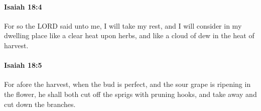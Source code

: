 		\paragraph{Isaiah 18:4} %
			\label{ISAIAH-18-4}

			For so the LORD said unto me, I will take my rest, and I will consider in my dwelling place like a clear heat upon herbs, and like a cloud of dew in the heat of harvest.


		\paragraph{Isaiah 18:5} %
			\label{ISAIAH-18-5}

			For afore the harvest, when the bud is perfect, and the sour grape is ripening in the flower, he shall both cut off the sprigs with pruning hooks, and take away and cut down the branches.


